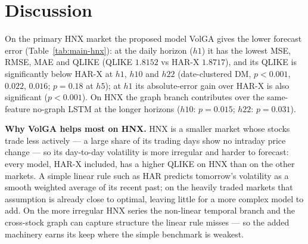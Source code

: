 \documentclass[runningheads]{llncs}
\begin{document}
\begin{table}[t]
\centering
\caption{Parkinson target: HAR-X vs VolGA on all four metrics, all markets (HNX first).
MSE $\times10^{-7}$, RMSE/MAE $\times10^{-4}$.}
\label{tab:est-park}
\footnotesize
\setlength{\tabcolsep}{5pt}

\end{table}

\begin{table}[t]
\centering
\caption{Windowed Yang--Zhang target (a smoothed twenty-day level; its QLIKE is not comparable to the single-day
measures). Same scaling as Table~\ref{tab:est-park}.}
\label{tab:est-yz}
\footnotesize
\setlength{\tabcolsep}{5pt}

\end{table}

\begin{table}[t]
\centering
\caption{Rogers--Satchell target (single-day). Same scaling as Table~\ref{tab:est-park}.}
\label{tab:est-rs}
\footnotesize
\setlength{\tabcolsep}{5pt}

\end{table}

\FloatBarrier
\section{Discussion}\label{sec:disc}
On the primary HNX market the proposed model VolGA gives the lower forecast error (Table~\ref{tab:main-hnx}): at
the daily horizon ($h1$) it has the lowest MSE, RMSE, MAE and QLIKE (QLIKE $1.8152$ vs HAR-X $1.8717$), and its
QLIKE is significantly below HAR-X at $h1$, $h10$ and $h22$ (date-clustered DM, $p<0.001$, $0.022$, $0.016$;
$p=0.18$ at $h5$); at $h1$ its absolute-error gain over HAR-X is also significant ($p<0.001$). On HNX the graph branch contributes over the same-feature no-graph LSTM at the longer horizons
($h10$: $p=0.015$; $h22$: $p=0.031$).

\textbf{Why VolGA helps most on HNX.} HNX is a smaller market whose stocks trade less actively --- a large
share of its trading days show no intraday price change --- so its day-to-day volatility is more irregular and
harder to forecast: every model, HAR-X included, has a higher QLIKE on HNX than on the other markets. A simple
linear rule such as HAR predicts tomorrow's volatility as a smooth weighted average of its recent past; on the
heavily traded markets that assumption is already close to optimal, leaving little for a more complex model to
add. On the more irregular HNX series the non-linear temporal branch and the cross-stock graph can capture
structure the linear rule misses --- so the added machinery earns its keep where the simple benchmark is
weakest.
\end{document}
